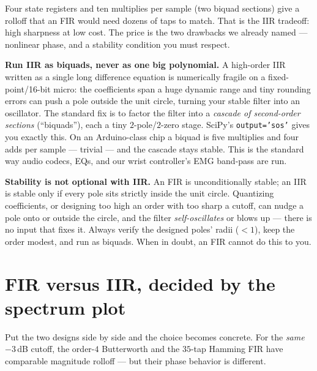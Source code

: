 Four state registers and ten multiplies per sample (two biquad sections) give a rolloff that an FIR
would need dozens of taps to match. That is the IIR tradeoff: high sharpness at low cost. The price is the two
drawbacks we already named --- nonlinear phase, and a stability condition you
must respect.

\begin{buildbox}
\textbf{Run IIR as biquads, never as one big polynomial.} A high-order IIR written
as a single long difference equation is numerically fragile on a
fixed-point/16-bit micro: the coefficients span a huge dynamic range and tiny
rounding errors can push a pole outside the unit circle, turning your stable filter
into an oscillator. The standard fix is to factor the filter into a \emph{cascade of
second-order sections} (``biquads''), each a tiny $2$-pole/$2$-zero stage. SciPy's
\texttt{output='sos'} gives you exactly this. On an Arduino-class chip a biquad is
five multiplies and four adds per sample --- trivial --- and the cascade stays
stable. This is the standard way audio codecs, EQs, and our wrist controller's
EMG band-pass are run.
\end{buildbox}

\begin{trapbox}
\textbf{Stability is not optional with IIR.} An FIR is unconditionally stable; an
IIR is stable only if every pole sits strictly inside the unit circle. Quantizing
coefficients, or designing too high an order with too sharp a cutoff, can nudge a
pole onto or outside the circle, and the filter \emph{self-oscillates} or blows up
--- there is no input that fixes it. Always verify the designed poles' radii
($<1$), keep the order modest, and run as biquads. When in doubt, an FIR cannot do
this to you.
\end{trapbox}

\section{FIR versus IIR, decided by the spectrum plot}
\label{ch16:compare}

Put the two designs side by side and the choice becomes concrete. For the
\emph{same} $-3$\,dB cutoff, the order-$4$ Butterworth and the $35$-tap Hamming FIR
have comparable magnitude rolloff --- but their phase behavior is different.

